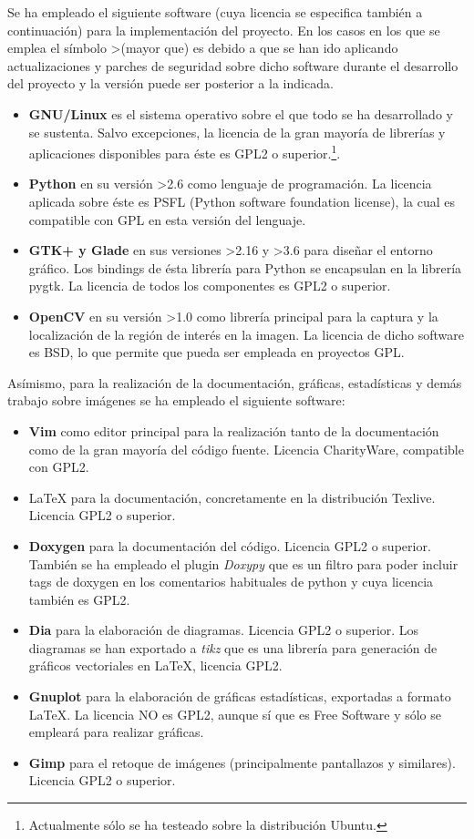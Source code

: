 Se ha empleado el siguiente software (cuya licencia se especifica también a continuación) para la implementación del proyecto. En los casos en los que se emplea el símbolo \textgreater (mayor que) es debido a que se han ido aplicando actualizaciones y parches de seguridad sobre dicho software durante el desarrollo del proyecto y la versión puede ser posterior a la indicada.
\begin{itemize}
	\item{\textbf{GNU/Linux} es el sistema operativo sobre el que todo se ha desarrollado y se sustenta. Salvo excepciones, la licencia de la gran mayoría de librerías y aplicaciones disponibles para éste es GPL2 o superior.\footnote{Actualmente sólo se ha testeado sobre la distribución Ubuntu.}.}
	\item{\textbf{Python} en su versión \textgreater2.6 como lenguaje de programación. La licencia aplicada sobre éste es PSFL (Python software foundation license), la cual es compatible con GPL en esta versión del lenguaje.}
	\item{\textbf{GTK+ y Glade} en sus versiones \textgreater2.16 y \textgreater3.6 para diseñar el entorno gráfico. Los bindings de ésta librería para Python se encapsulan en la librería pygtk. La licencia de todos los componentes es GPL2 o superior.}
	\item{\textbf{OpenCV} en su versión \textgreater1.0 como librería principal para la captura y la localización de la región de interés en la imagen. La licencia de dicho software es BSD, lo que permite que pueda ser empleada en proyectos GPL.}
\end{itemize}
Asímismo, para la realización de la documentación, gráficas, estadísticas y demás trabajo sobre imágenes se ha empleado el siguiente software:
\begin{itemize}
	\item{\textbf{Vim} como editor principal para la realización tanto de la documentación como de la gran mayoría del código fuente. Licencia CharityWare, compatible con GPL2.}
	\item{\LaTeX{} para la documentación, concretamente en la distribución Texlive. Licencia GPL2 o superior.}
	\item{\textbf{Doxygen} para la documentación del código. Licencia GPL2 o superior. También se ha empleado el plugin \textit{Doxypy} que es un filtro para poder incluir tags de doxygen en los comentarios habituales de python y cuya licencia también es GPL2.}
	\item{\textbf{Dia} para la elaboración de diagramas. Licencia GPL2 o superior. Los diagramas se han exportado a \textit{tikz} que es una librería para generación de gráficos vectoriales en \LaTeX{}, licencia GPL2. }
	\item{\textbf{Gnuplot} para la elaboración de gráficas estadísticas, exportadas a formato \LaTeX{}. La licencia NO es GPL2, aunque sí que es Free Software y sólo se empleará para realizar gráficas.}
	\item{\textbf{Gimp} para el retoque de imágenes (principalmente pantallazos y similares). Licencia GPL2 o superior.}
\end{itemize}

